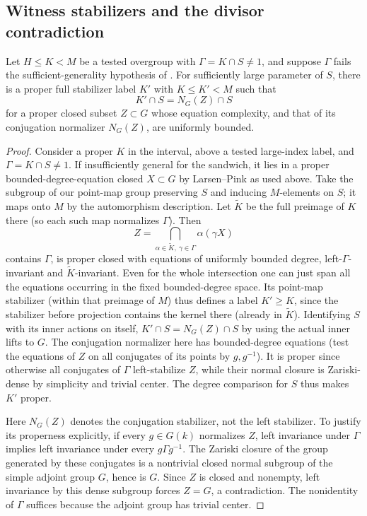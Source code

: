 \subsection{Witness stabilizers and the divisor contradiction}

\begin{lemma}\label{w:witness}
Let $H\le K<M$ be a tested overgroup with $\Gamma=K\cap S\ne1$, and suppose $\Gamma$ fails the sufficient-generality hypothesis of . For sufficiently large parameter of $S$, there is a proper full stabilizer label $K'$ with $K\le K'<M$ such that
\[
 K'\cap S=N_G(Z)\cap S
\]
for a proper closed subset $Z\subset G$ whose equation complexity, and that of its conjugation normalizer $N_G(Z)$, are uniformly bounded.
\end{lemma}
\begin{proof}
Consider a proper \(K\) in the interval, above a tested large-index label, and \(\Gamma=K\cap S\ne1\). If insufficiently general for the sandwich, it lies in a proper bounded-degree-equation closed \(X\subset G\) by Larsen--Pink as used above. Take the subgroup of our point-map group preserving \(S\) and inducing \(M\)-elements on \(S\); it maps onto \(M\) by the automorphism description. Let \(\tilde K\) be the full preimage of \(K\) there (so each such map normalizes \(\Gamma\)). Then
\[
 Z=\bigcap_{\alpha\in\tilde K,\ \gamma\in\Gamma} \alpha(\gamma X)
\]
contains \(\Gamma\), is proper closed with equations of uniformly bounded degree, left-\(\Gamma\)-invariant and \(\tilde K\)-invariant. Even for the whole intersection one can just span all the equations occurring in the fixed bounded-degree space. Its point-map stabilizer (within that preimage of \(M\)) thus defines a label \(K'\ge K\), since the stabilizer before projection contains the kernel there (already in \(\tilde K\)). Identifying \(S\) with its inner actions on itself, \(K'\cap S=N_G(Z)\cap S\) by using the actual inner lifts to \(G\). The conjugation normalizer here has bounded-degree equations (test the equations of \(Z\) on all conjugates of its points by \(g,g^{-1}\)). It is proper since otherwise all conjugates of \(\Gamma\) left-stabilize \(Z\), while their normal closure is Zariski-dense by simplicity and trivial center. The degree comparison for \(S\) thus makes \(K'\) proper.

Here $N_G(Z)$ denotes the conjugation stabilizer, not the left stabilizer. To justify its properness explicitly, if every $g\in G(k)$ normalizes $Z$, left invariance under $\Gamma$ implies left invariance under every $g\Gamma g^{-1}$. The Zariski closure of the group generated by these conjugates is a nontrivial closed normal subgroup of the simple adjoint group $G$, hence is $G$. Since $Z$ is closed and nonempty, left invariance by this dense subgroup forces $Z=G$, a contradiction. The nonidentity of $\Gamma$ suffices because the adjoint group has trivial center.
\end{proof}

